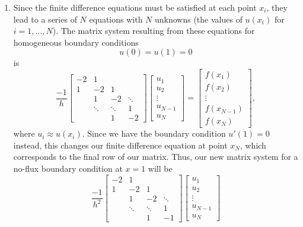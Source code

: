 {\begin{solution}
\begin{enumerate}
Alternatively, since the problem specifies the solution is a quadratic, it is possible to simply specify
\[
u(x) = ax^2 + bx + c
\]
and use the differential equation and boundary conditions to determine the constants.
\item Since the finite difference equations must be satisfied at each point $x_i$, they lead to a series of $N$ equations with $N$ unknowns (the values of $u(x_i)$ for $i = 1,\ldots, N$).
The matrix system resulting from these equations for homogeneous boundary conditions
\[
u(0) = u(1) = 0
\]
is
\[
\frac{-1}{h} 
\left[
\begin{array}{rrrr}
              -2 & 1 & &\\[0.25em]
               1 & -2 & 1 &\\
                 &  1  & -2 & \ddots \\
                 & \ddots & \ddots & 1 \\[0.25em]
                 & & 1 & -2
               \end{array}\right]
          \left[\begin{array}{c} u_1 \\[0.25em] u_2 \\[0.25em] \vdots \\[0.25em] u_{N-1} \\[0.25em] u_N \end{array}\right]
 =   \left[\begin{array}{c} f(x_1) \\[0.25em] f(x_2) \\[0.25em] \vdots \\[0.25em] f(x_{N-1}) \\[0.25em] f(x_N) \end{array}\right],
\]
where $u_i \approx u(x_i)$. Since we have the boundary condition $u'(1) = 0$ instead, this changes our finite difference equation at point $x_N$, which corresponds to the final row of our matrix. Thus, our new matrix system for a no-flux boundary condition at $x = 1$ will be
\[
\frac{-1}{h^2} \left[\begin{array}{rrrrr}
              -2 & 1 \\[0.25em]
               1 & -2 & 1 \\
                 &  1  & -2 & \ddots \\
                 & \ddots & \ddots & 1 \\[0.25em]
                 & & 1 & -1
               \end{array}\right]
          \left[\begin{array}{c} u_1 \\[0.25em] u_2 \\[0.25em] \vdots \\[0.25em] u_{N-1} \\[0.25em] u_N \end{array}\right]
\]
\end{enumerate}
\end{solution}}
